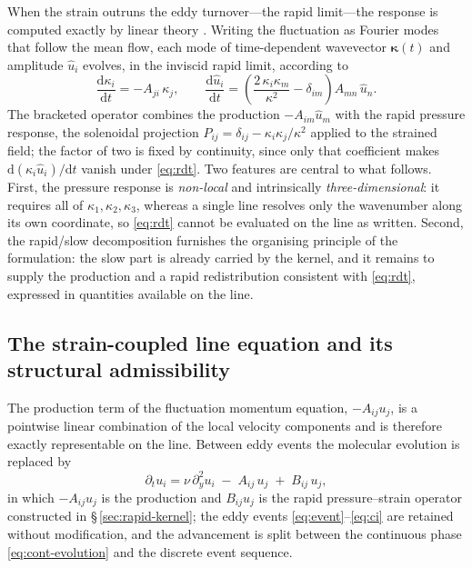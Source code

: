 \documentclass[lineno]{JFM-FLM_Au}
\begin{document}
When the strain outruns the eddy turnover---the rapid limit---the
response is computed exactly by linear theory
\citep{BatchelorProudman1954,Hunt1973,HuntCarruthers1990}. Writing the
fluctuation as Fourier modes that follow the mean flow, each mode of
time-dependent wavevector $\boldsymbol{\kappa}(t)$ and amplitude
$\hat{u}_i$ evolves, in the inviscid rapid limit, according to
\begin{equation}
  \frac{\mathrm{d}\kappa_i}{\mathrm{d}t}=-A_{ji}\,\kappa_j,
  \qquad
  \frac{\mathrm{d}\hat{u}_i}{\mathrm{d}t}
  =\left(\frac{2\,\kappa_i \kappa_m}{\kappa^2}-\delta_{im}\right)
   A_{mn}\,\hat{u}_n .
  \label{eq:rdt}
\end{equation}
The bracketed operator combines the production $-A_{im}\hat u_m$ with the
rapid pressure response, the solenoidal projection
$P_{ij}=\delta_{ij}-\kappa_i\kappa_j/\kappa^2$ applied to the strained
field; the factor of two is fixed by continuity, since only that
coefficient makes $\mathrm{d}(\kappa_i\hat u_i)/\mathrm{d}t$ vanish under
\eqref{eq:rdt}. Two features are central to what follows. First, the
pressure response is \emph{non-local} and intrinsically
\emph{three-dimensional}: it requires all of
$\kappa_1,\kappa_2,\kappa_3$, whereas a single line resolves only the
wavenumber along its own coordinate, so \eqref{eq:rdt} cannot be
evaluated on the line as written. Second, the rapid/slow decomposition
furnishes the organising principle of the formulation: the slow part is
already carried by the kernel, and it remains to supply the production
and a rapid redistribution consistent with \eqref{eq:rdt}, expressed in
quantities available on the line.

\subsection{The strain-coupled line equation and its structural
admissibility}\label{sec:strain-forcing}

The production term of the fluctuation momentum equation, $-A_{ij}u_j$,
is a pointwise linear combination of the local velocity components and is
therefore exactly representable on the line. Between eddy events the
molecular evolution is replaced by
\begin{equation}
  \partial_t u_i
  = \nu\,\partial_y^2 u_i \;-\; A_{ij}\,u_j \;+\; B_{ij}\,u_j,
  \label{eq:cont-evolution}
\end{equation}
in which $-A_{ij}u_j$ is the production and $B_{ij}u_j$ is the rapid
pressure--strain operator constructed in \S\,\ref{sec:rapid-kernel}; the
eddy events \eqref{eq:event}--\eqref{eq:ci} are retained without
modification, and the advancement is split between the continuous phase
\eqref{eq:cont-evolution} and the discrete event sequence.
\end{document}
